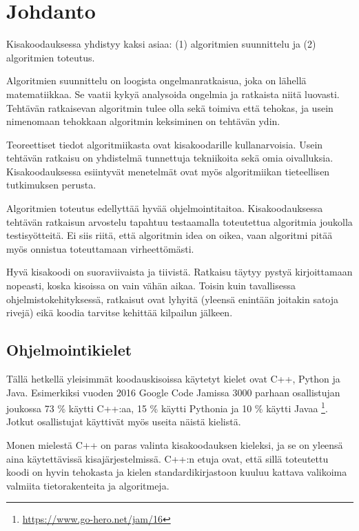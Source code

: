 \chapter{Johdanto}

Kisakoodauksessa yhdistyy kaksi asiaa:
(1) algoritmien suunnittelu ja
(2) algoritmien toteutus.

Algoritmien suunnittelu on loogista ongelmanratkaisua,
joka on lähellä matematiikkaa.
Se vaatii kykyä analysoida ongelmia ja
ratkaista niitä luovasti.
Tehtävän ratkaisevan algoritmin tulee olla sekä
toimiva että tehokas,
ja usein nimenomaan tehokkaan algoritmin
keksiminen on tehtävän ydin.

Teoreettiset tiedot algoritmiikasta
ovat kisakoodarille kullanarvoisia.
Usein tehtävän ratkaisu on yhdistelmä tunnettuja
tekniikoita sekä omia oivalluksia.
Kisakoodauksessa esiintyvät menetelmät ovat myös
algoritmiikan tieteellisen tutkimuksen perusta.

Algoritmien toteutus edellyttää hyvää ohjelmointitaitoa.
Kisakoodauksessa tehtävän ratkaisun arvostelu tapahtuu
testaamalla toteutettua algoritmia
joukolla testisyötteitä.
Ei siis riitä, että algoritmin idea on oikea,
vaan algoritmi pitää myös onnistua toteuttamaan virheettömästi.

Hyvä kisakoodi on suoraviivaista ja tiivistä.
Ratkaisu täytyy pystyä kirjoittamaan nopeasti,
koska kisoissa on vain vähän aikaa.
Toisin kuin tavallisessa ohjelmistokehityksessä,
ratkaisut ovat lyhyitä
(yleensä enintään joitakin satoja rivejä)
eikä koodia tarvitse kehittää kilpailun jälkeen.



\section{Ohjelmointikielet}

Tällä hetkellä yleisimmät koodauskisoissa
käytetyt kielet ovat C++, Python ja Java.
Esimerkiksi vuoden 2016 Google Code Jamissa
3000 parhaan osallistujan joukossa
73 \% käytti C++:aa,
15 \% käytti Pythonia ja
10 \% käytti Javaa \footnote{\url{https://www.go-hero.net/jam/16}}.
Jotkut osallistujat käyttivät myös useita näistä kielistä.

Monen mielestä C++ on paras
valinta kisakoodauksen kieleksi,
ja se on yleensä aina käytettävissä
kisajärjestelmissä.
C++:n etuja ovat, että sillä
toteutettu koodi on hyvin tehokasta
ja kielen standardikirjastoon
kuuluu kattava valikoima valmiita
tietorakenteita ja algoritmeja.

